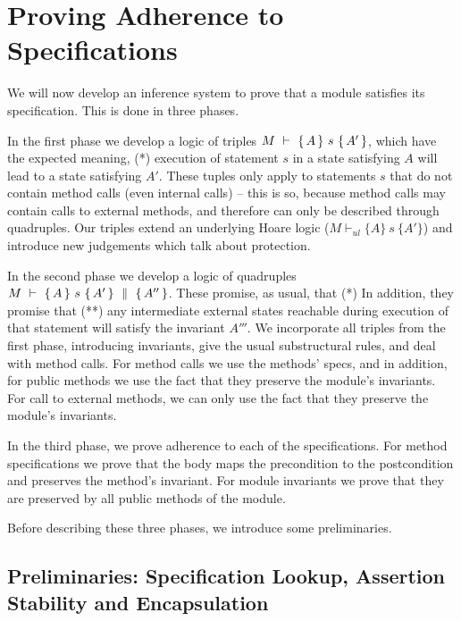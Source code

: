 

\section{Proving Adherence to \SpecLang Specifications}
\label{sect:proofSystem}

We will now develop an inference system to prove that a module %
satisfies its specification. This is done in three phases.

In the first phase we develop a logic of triples ${M\ \vdash\ \{\,A\, \} \ s\  \{\,A'\, \} }$, which have the expected meaning, \ie 
(*) execution of statement $s$ in a state satisfying   $A$ will lead to a state satisfying    $A'$.
These tuples only apply to statements $s$ that  do not contain method calls  (even internal calls) -- this is so, because method calls may contain calls to external methods, and therefore can only be described through quadruples.
Our triples extend an underlying Hoare logic  (${M \vdash_{ul}  \{A\} {\ s\ } \{A'\} }$) and  introduce new judgements  which talk about protection.

In the second phase we develop a logic of quadruples ${M\ \vdash\ \{\,A\, \} \ s\  \{\,A'\, \}\, \,\parallel\,\, \{\, A'' \, \}}$. These promise, as usual, that (*) 
In addition, they promise that (**) any intermediate external states reachable during execution of that statement will satisfy the invariant  $A'''$.  
 We incorporate all triples from the first phase,       
introducing invariants, give the usual substructural rules, and deal with method calls. 
For method calls we use the methods' specs, and in addition, for public methods we use the fact that they preserve the module's invariants. 
For call to external  methods, we can only use the fact that they preserve the module's invariants. 
 
In the third phase, we prove adherence to each of the specifications. 
For method specifications we prove that the body maps the precondition to the postcondition and preserves the method's invariant. 
For module invariants we prove that they  are preserved by all public methods of the module.

\vspace{.1cm}
Before describing these three phases, we introduce some preliminaries.


\subsection{Preliminaries: Specification Lookup, Assertion Stability  and  Encapsulation}


